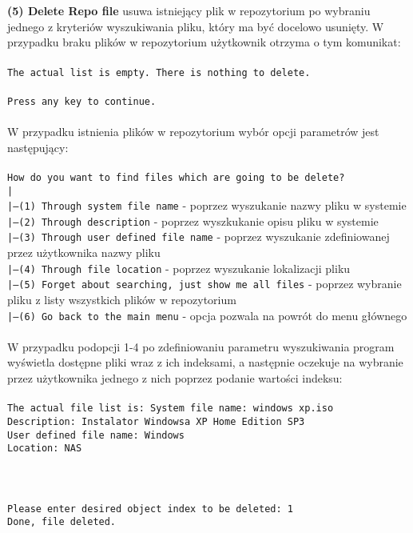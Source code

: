 \documentclass[10pt, a4paper]{article}
\begin{document}
\\
\\
\textbf{(5) Delete Repo file} usuwa istniejący plik w repozytorium po wybraniu jednego z kryteriów wyszukiwania pliku, który ma być docelowo usunięty. W przypadku braku plików w repozytorium użytkownik otrzyma o tym komunikat:\\
\\
\texttt{The actual list is empty. There is nothing to delete.\\
\\
Press any key to continue.}\\
\\
W przypadku istnienia plików w repozytorium wybór opcji parametrów jest następujący:\\
\\
\texttt{How do you want to find files which are going to be delete?}\\
\texttt{|}\\
\texttt{|---(1) Through system file name} - poprzez wyszukanie nazwy pliku w systemie\\
\texttt{|---(2) Through description} - poprzez wyszkukanie opisu pliku w systemie\\
\texttt{|---(3) Through user defined file name} - poprzez wyszukanie zdefiniowanej przez użytkownika nazwy pliku\\
\texttt{|---(4) Through file location} - poprzez wyszukanie lokalizacji pliku\\
\texttt{|---(5) Forget about searching, just show me all files} - poprzez wybranie pliku z listy wszystkich plików w repozytorium\\
\texttt{|---(6) Go back to the main menu} - opcja pozwala na powrót do menu głównego\\
\\
W przypadku podopcji 1-4 po zdefiniowaniu parametru wyszukiwania program wyświetla dostępne pliki wraz z ich indeksami, a następnie oczekuje na wybranie przez użytkownika jednego z nich poprzez podanie wartości indeksu:
\\
\\
\texttt{The actual file list is:
System file name: windows xp.iso\\
Description: Instalator Windowsa XP Home Edition SP3\\
User defined file name: Windows\\
Location: NAS\\
\\
\\
\\
Please enter desired object index to be deleted: 1\\
Done, file deleted.}\\
\end{document}
